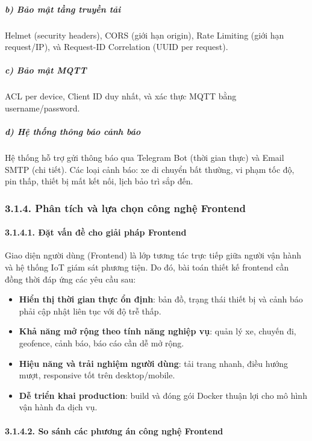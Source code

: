 \documentclass[13pt,a4paper]{extarticle}
\renewcommand{\\}{\thesislongtableorignewline\hline}%
\providecommand{\tightlist}{%
  \setlength{\itemsep}{0pt}\setlength{\parskip}{0pt}}
\begin{document}
\subparagraph{b) Bảo mật tầng truyền
tải}\label{b-bux1ea3o-mux1eadt-tux1ea7ng-truyux1ec1n-tux1ea3i}

Helmet (security headers), CORS (giới hạn origin), Rate Limiting (giới
hạn request/IP), và Request-ID Correlation (UUID per request).

\subparagraph{c) Bảo mật MQTT}\label{c-bux1ea3o-mux1eadt-mqtt}

ACL per device, Client ID duy nhất, và xác thực MQTT bằng
username/password.

\subparagraph{d) Hệ thống thông báo cảnh
báo}\label{d-hux1ec7-thux1ed1ng-thuxf4ng-buxe1o-cux1ea3nh-buxe1o}

Hệ thống hỗ trợ gửi thông báo qua Telegram Bot (thời gian thực) và Email
SMTP (chi tiết). Các loại cảnh báo: xe di chuyển bất thường, vi phạm tốc
độ, pin thấp, thiết bị mất kết nối, lịch bảo trì sắp đến.

\subsubsection{3.1.4. Phân tích và lựa chọn công nghệ Frontend}

\paragraph{3.1.4.1. Đặt vấn đề cho giải pháp
Frontend}\label{3141-ux111ux1eb7t-vux1ea5n-ux111ux1ec1-cho-giux1ea3i-phuxe1p-frontend}

Giao diện người dùng (Frontend) là lớp tương tác trực tiếp giữa người
vận hành và hệ thống IoT giám sát phương tiện. Do đó, bài toán thiết kế
frontend cần đồng thời đáp ứng các yêu cầu sau:

\begin{itemize}
\tightlist
\item
  \textbf{Hiển thị thời gian thực ổn định}: bản đồ, trạng thái thiết bị
  và cảnh báo phải cập nhật liên tục với độ trễ thấp.
\item
  \textbf{Khả năng mở rộng theo tính năng nghiệp vụ}: quản lý xe, chuyến
  đi, geofence, cảnh báo, báo cáo cần dễ mở rộng.
\item
  \textbf{Hiệu năng và trải nghiệm người dùng}: tải trang nhanh, điều
  hướng mượt, responsive tốt trên desktop/mobile.
\item
  \textbf{Dễ triển khai production}: build và đóng gói Docker thuận lợi
  cho mô hình vận hành đa dịch vụ.
\end{itemize}

\paragraph{3.1.4.2. So sánh các phương án công nghệ
Frontend}\label{3142-so-suxe1nh-cuxe1c-phux1b0ux1a1ng-uxe1n-cuxf4ng-nghux1ec7-frontend}
\end{document}
